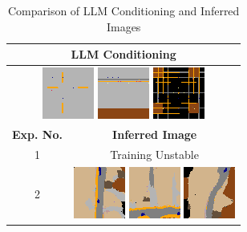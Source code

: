 \documentclass{article}
\begin{document}
\begin{table}
\centering
\caption{Comparison of LLM Conditioning and Inferred Images}
\begin{tabular}{c | c}
\toprule
\multicolumn{2}{c}{\textbf{LLM Conditioning}} \\
\midrule
\multicolumn{2}{c}{
  \includegraphics[width=0.25\linewidth]{images/llm_conditioning1.png} \hspace{2pt}
  \includegraphics[width=0.25\linewidth]{images/llm_conditioning2.png} \hspace{2pt}
  \includegraphics[width=0.25\linewidth]{images/llm_conditioning3.png}
} \\
\midrule
\textbf{Exp. No.} & \textbf{Inferred Image} \\
\midrule

1 & \multicolumn{1}{c}{Training Unstable} \\
\midrule

2 &
\includegraphics[width=0.15\linewidth]{images/llm_inferred1_exp2.png}
\includegraphics[width=0.15\linewidth]{images/llm_inferred2_exp2.png}
\includegraphics[width=0.15\linewidth]{images/llm_inferred3_exp2.png} \\
\midrule


\end{tabular}
\end{table}
\end{document}
